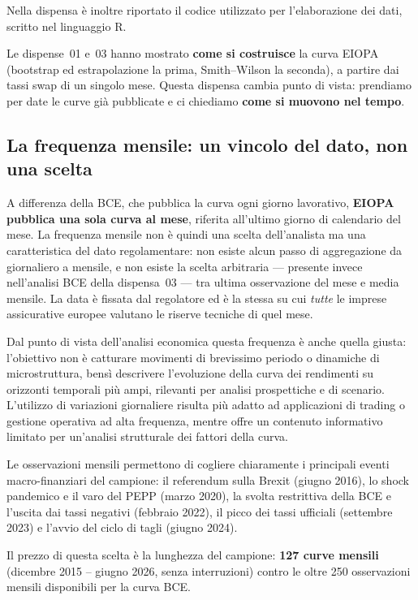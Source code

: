 \documentclass[11pt,a4paper]{article}
\theoremstyle{plain}
\theoremstyle{definition}
\theoremstyle{remark}
\begin{document}
Nella dispensa \`e inoltre riportato il codice utilizzato per l'elaborazione dei
dati, scritto nel linguaggio R.

\medskip
Le dispense~01 e~03 hanno mostrato \textbf{come si costruisce} la curva EIOPA
(bootstrap ed estrapolazione la prima, Smith--Wilson la seconda), a partire dai
tassi swap di un singolo mese. Questa dispensa cambia punto di vista: prendiamo
per date le curve gi\`a pubblicate e ci chiediamo \textbf{come si muovono nel
tempo}.

\subsection{La frequenza mensile: un vincolo del dato, non una scelta}
\label{sec:motivazione-mensile}

A differenza della BCE, che pubblica la curva ogni giorno lavorativo,
\textbf{EIOPA pubblica una sola curva al mese}, riferita all'ultimo giorno di
calendario del mese. La frequenza mensile non \`e quindi una scelta
dell'analista ma una caratteristica del dato regolamentare: non esiste alcun
passo di aggregazione da giornaliero a mensile, e non esiste la scelta
arbitraria --- presente invece nell'analisi BCE della dispensa~03 --- tra
ultima osservazione del mese e media mensile. La data \`e fissata dal
regolatore ed \`e la stessa su cui \emph{tutte} le imprese assicurative europee
valutano le riserve tecniche di quel mese.

Dal punto di vista dell'analisi economica questa frequenza \`e anche quella
giusta: l'obiettivo non \`e catturare movimenti di brevissimo periodo o
dinamiche di microstruttura, bens\`i descrivere l'evoluzione della curva dei
rendimenti su orizzonti temporali pi\`u ampi, rilevanti per analisi prospettiche
e di scenario. L'utilizzo di variazioni giornaliere risulta pi\`u adatto ad
applicazioni di trading o gestione operativa ad alta frequenza, mentre offre un
contenuto informativo limitato per un'analisi strutturale dei fattori della curva.

Le osservazioni mensili permettono di cogliere chiaramente i principali eventi
macro-finanziari del campione: il referendum sulla Brexit (giugno 2016), lo
shock pandemico e il varo del PEPP (marzo 2020), la svolta restrittiva della BCE
e l'uscita dai tassi negativi (febbraio 2022), il picco dei tassi ufficiali
(settembre 2023) e l'avvio del ciclo di tagli (giugno 2024).

Il prezzo di questa scelta \`e la lunghezza del campione: \textbf{127 curve
mensili} (dicembre 2015 -- giugno 2026, senza interruzioni) contro le oltre 250
osservazioni mensili disponibili per la curva BCE.
\end{document}
